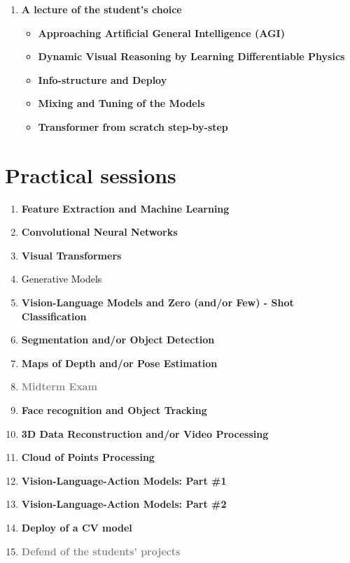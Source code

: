 \documentclass[a4paper,11pt]{texMemo}
\begin{document}
\begin{enumerate}
\item \textbf{A lecture of the student's choice}
\begin{itemize}
    \item \textbf{Approaching Artificial General Intelligence (AGI)} \citep{deepseekai2025deepseekr1incentivizingreasoningcapability}
    \item \textbf{Dynamic Visual Reasoning by Learning Differentiable Physics} \citep{}
    \item \textbf{Info-structure and Deploy} \citep{}
    \item \textbf{Mixing and Tuning of the Models} \citep{}
    \item \textbf{Transformer from scratch step-by-step} \citep{}
\end{itemize}

\end{enumerate}

\section{Practical sessions}
\begin{enumerate}
    \item \textbf{Feature Extraction and Machine Learning} \citep{gitCV-2026, LightningColab}
    \item \textbf{Convolutional Neural Networks} \citep{gitCV-2026}
    \item \textbf{Visual Transformers}  \citep{gitCV-2026}
    \item \textcolor{black}{Generative Models \citep{gitCV-2026}}%
    \item \textbf{Vision-Language Models and Zero (and/or Few) - Shot Classification} \cite{gitCV-2026}
    \item \textbf{Segmentation and/or Object Detection} \citep{gitCV-2026}
    \item \textbf{Maps of Depth and/or Pose Estimation} \citep{gitCV-2026}
    \item \textcolor{gray}{\textbf{Midterm Exam}}
    \item \textbf{Face recognition and Object Tracking} \citep{gitCV-2026}
    \item \textbf{3D Data Reconstruction and/or Video Processing} \citep{gitCV-2026}
    \item \textbf{Cloud of Points Processing} \cite{gitCV-2026, YandexHandbookML}
    \item \textbf{Vision-Language-Action Models: Part \#1} \citep{gitCV-2026}
    \item \textbf{Vision-Language-Action Models: Part \#2} \citep{gitCV-2026}
    \item \textbf{Deploy of a CV model} \citep{gitCV-2026}
    \item \textcolor{gray}{\textbf{Defend of the students' projects}}
\end{enumerate}
\end{document}
